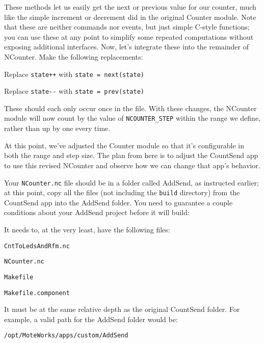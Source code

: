 \documentclass{article}
\begin{document}
These methods let us easily get the next or previous value for our counter, much like the simple increment or decrement did in the original Counter module. Note that these are neither commands nor events, but just simple C-style functions; you can use these at any point to simplify some repeated computations without exposing additional interfaces. Now, let's integrate these into the remainder of NCounter. Make the following replacements:

\begin{itemize*}
\item Replace \verb!state++! with \verb!state = next(state)!
\item Replace \verb!state--! with \verb!state = prev(state)!
\end{itemize*}

These should each only occur once in the file. With these changes, the NCounter module will now count by the value of \verb!NCOUNTER_STEP! within the range we define, rather than up by one every time.


At this point, we've adjusted the Counter module so that it's configurable in both the range and step size. The plan from here is to adjust the CountSend app to use this revised NCounter and observe how we can change that app's behavior.

Your \verb!NCounter.nc! file should be in a folder called AddSend, as instructed earlier; at this point, copy all the files (not including the \verb!build! directory) from the CountSend app into the AddSend folder. You need to guarantee a couple conditions about your AddSend project before it will build:

\begin{itemize*}
\item It needs to, at the very least, have the following files:
\begin{itemize*}
\item \verb!CntToLedsAndRfm.nc!
\item \verb!NCounter.nc!
\item \verb!Makefile!
\item \verb!Makefile.component!
\end{itemize*}
\item It must be at the same relative depth as the original CountSend folder. For example, a valid path for the AddSend folder would be:

\begin{verbatim}
/opt/MoteWorks/apps/custom/AddSend
\end{verbatim}
\end{itemize*}
\end{document}
